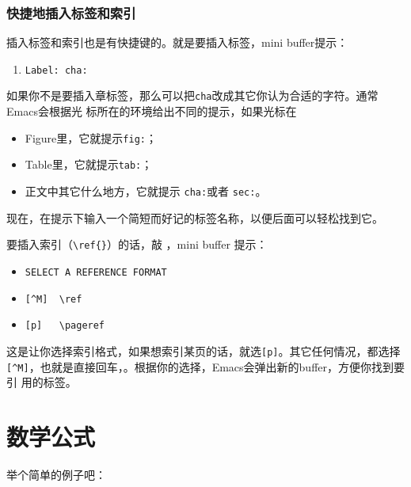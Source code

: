 \subsubsection*{快捷地插入标签和索引}

插入标签和索引也是有快捷键的。\Cc{}{\kbd \{}就是要插入标签，mini
buffer提示：

\begin{enumerate}
\item[] \texttt{Label: cha:}
\end{enumerate}

如果你不是要插入章标签，那么可以把\texttt{cha}改成其它你认为合适的字符。通常Emacs会根据光
标所在的环境给出不同的提示，如果光标在

\begin{itemize}
\item Figure里，它就提示\texttt{fig:}；
\item Table里，它就提示\texttt{tab:}；
\item 正文中其它什么地方，它就提示 \texttt{cha:}或者 \texttt{sec:}。
\end{itemize}

现在，在提示下输入一个简短而好记的标签名称，以便后面可以轻松找到它。

要插入索引（\verb'\ref{}'）的话，敲 \Cc{}{\kbd \}}，mini buffer 提示：

\begin{itemize}
\item[] \texttt{SELECT A REFERENCE FORMAT}
\item[] \verb'[^M]  \ref'
\item[] \verb'[p]   \pageref' 
\end{itemize}

这是让你选择索引格式，如果想索引某页的话，就选\texttt{[p]}。其它任何情况，都选择
\verb'[^M]'，也就是直接回车，\Enter{}。根据你的选择，Emacs会弹出新的buffer，方便你找到要引
用的标签。

\section{数学公式}
\label{sec:math}

举个简单的例子吧：

\begin{codeblock}[.9]
\end{codeblock}


